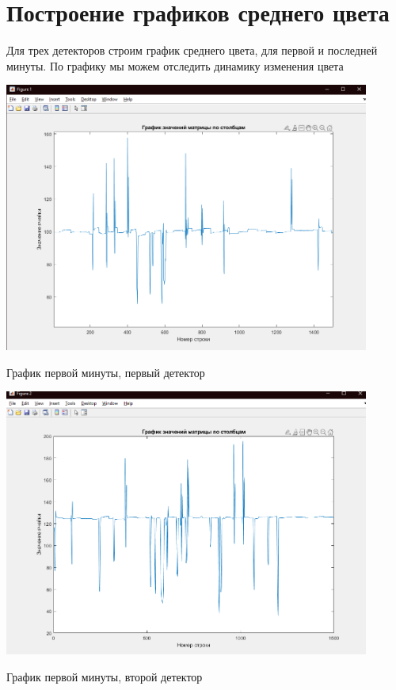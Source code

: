 \documentclass[a4paper,12pt]{article}
\begin{document}
\newpage
\section*{Построение графиков среднего цвета}
Для трех детекторов строим график среднего цвета, для первой и последней минуты.
По графику мы можем отследить динамику изменения цвета

\begin{center}
\includegraphics[width=0.9\textwidth]{images/median/median_color_first_1.png}
\end{center}
\begin{center}
График первой минуты, первый детектор
\end{center}

\begin{center}
\includegraphics[width=0.9\textwidth]{images/median/median_color_first_2.png}
\end{center}
\begin{center}
График первой минуты, второй детектор
\end{center}
\end{document}
